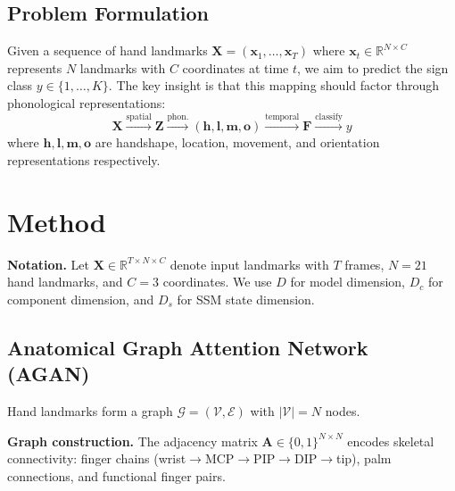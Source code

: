 \documentclass{article}
\theoremstyle{definition}
\theoremstyle{remark}
\begin{document}
\subsection{Problem Formulation}

Given a sequence of hand landmarks $\mathbf{X} = (\mathbf{x}_1, \ldots, \mathbf{x}_T)$ where $\mathbf{x}_t \in \mathbb{R}^{N \times C}$ represents $N$ landmarks with $C$ coordinates at time $t$, we aim to predict the sign class $y \in \{1, \ldots, K\}$. The key insight is that this mapping should factor through phonological representations:
\begin{equation}
\mathbf{X} \xrightarrow{\text{spatial}} \mathbf{Z} \xrightarrow{\text{phon.}} (\mathbf{h}, \mathbf{l}, \mathbf{m}, \mathbf{o}) \xrightarrow{\text{temporal}} \mathbf{F} \xrightarrow{\text{classify}} y
\end{equation}
where $\mathbf{h}, \mathbf{l}, \mathbf{m}, \mathbf{o}$ are handshape, location, movement, and orientation representations respectively.

\section{Method}
\label{sec:method}

\textbf{Notation.} Let $\mathbf{X} \in \mathbb{R}^{T \times N \times C}$ denote input landmarks with $T$ frames, $N=21$ hand landmarks, and $C=3$ coordinates. We use $D$ for model dimension, $D_c$ for component dimension, and $D_s$ for SSM state dimension.

\subsection{Anatomical Graph Attention Network (AGAN)}

Hand landmarks form a graph $\mathcal{G} = (\mathcal{V}, \mathcal{E})$ with $|\mathcal{V}| = N$ nodes.

\textbf{Graph construction.} The adjacency matrix $\mathbf{A} \in \{0,1\}^{N \times N}$ encodes skeletal connectivity: finger chains (wrist$\to$MCP$\to$PIP$\to$DIP$\to$tip), palm connections, and functional finger pairs.
\end{document}
